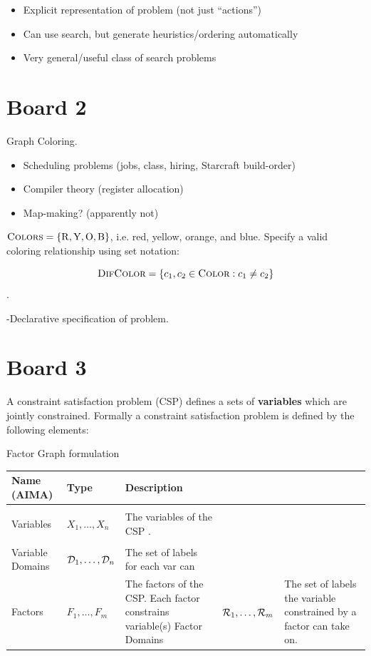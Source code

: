 \documentclass[10pt]{article}
\begin{document}
\begin{itemize}
\item Explicit representation of problem (not just ``actions'')
\item Can use search, but generate heuristics/ordering automatically
\item Very general/useful class of search problems  
\end{itemize}

\section{Board 2}


Graph Coloring.

\begin{itemize}
\item Scheduling problems (jobs, class, hiring, Starcraft build-order) 
\item Compiler theory (register allocation)
\item Map-making? (apparently not)
\end{itemize}

 $\mathrm{\textsc{Colors}} = \{\mathrm{R, Y, O, B}\}$, i.e. red, yellow, orange, and blue. Specify
a valid coloring relationship using set notation: 

\[\mathrm{\textsc{DifColor}} = \{c_1, c_2 \in \mathrm{\textsc{Color}} : c_1 \neq c_2 \}\].

-Declarative specification of problem. 

\section{Board 3}


A constraint satisfaction problem (CSP) defines a sets of \textbf{variables} which are jointly constrained. Formally a constraint satisfaction problem is defined by the following elements:

Factor Graph formulation

 \air
\begin{center}
\begin{tabularx}{\linewidth}{llX}
  \toprule
  Name (AIMA) & Type & Description \\
  \midrule
\\
 Variables & $X_1, \ldots, X_n$ &  The variables of the CSP .\\\\
 Variable Domains & $\mathcal{D}_1, \ldots, \mathcal{D}_n$&   The set of labels for each var can 
 \midrule\\
 Factors & $F_1, \ldots,F_m$ &  The factors of the CSP. Each factor constrains variable(s)
 Factor Domains &  $\mathcal{R}_1, \ldots, \mathcal{R}_m$ & The set of labels the variable constrained by a factor can take on. 
 \bottomrule
\end{tabularx}
\end{center}
\end{document}
